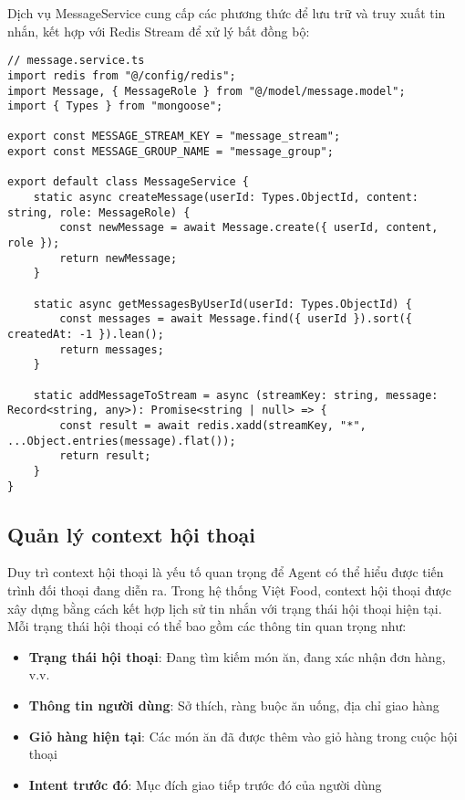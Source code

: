 Dịch vụ MessageService cung cấp các phương thức để lưu trữ và truy xuất tin nhắn, kết hợp với Redis Stream để xử lý bất đồng bộ:

\begin{verbatim}
// message.service.ts
import redis from "@/config/redis";
import Message, { MessageRole } from "@/model/message.model";
import { Types } from "mongoose";

export const MESSAGE_STREAM_KEY = "message_stream";
export const MESSAGE_GROUP_NAME = "message_group";

export default class MessageService {
    static async createMessage(userId: Types.ObjectId, content: string, role: MessageRole) {
        const newMessage = await Message.create({ userId, content, role });
        return newMessage;
    }

    static async getMessagesByUserId(userId: Types.ObjectId) {
        const messages = await Message.find({ userId }).sort({ createdAt: -1 }).lean();
        return messages;
    }

    static addMessageToStream = async (streamKey: string, message: Record<string, any>): Promise<string | null> => {
        const result = await redis.xadd(streamKey, "*", ...Object.entries(message).flat());
        return result;
    }
}
\end{verbatim}

\subsection{Quản lý context hội thoại}

Duy trì context hội thoại là yếu tố quan trọng để Agent có thể hiểu được tiến trình đối thoại đang diễn ra. Trong hệ thống Việt Food, context hội thoại được xây dựng bằng cách kết hợp lịch sử tin nhắn với trạng thái hội thoại hiện tại. Mỗi trạng thái hội thoại có thể bao gồm các thông tin quan trọng như:

\begin{itemize}
    \item \textbf{Trạng thái hội thoại}: Đang tìm kiếm món ăn, đang xác nhận đơn hàng, v.v.
    \item \textbf{Thông tin người dùng}: Sở thích, ràng buộc ăn uống, địa chỉ giao hàng
    \item \textbf{Giỏ hàng hiện tại}: Các món ăn đã được thêm vào giỏ hàng trong cuộc hội thoại
    \item \textbf{Intent trước đó}: Mục đích giao tiếp trước đó của người dùng
\end{itemize}


